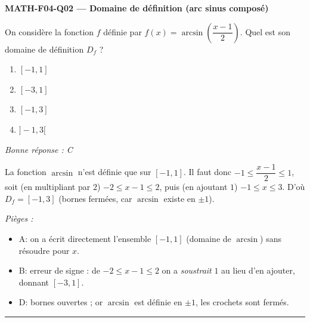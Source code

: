 \documentclass[11pt,a4paper]{article}
\begin{document}
\noindent\textbf{MATH-F04-Q02 --- Domaine de définition (arc sinus composé)}\par
On considère la fonction $f$ définie par $f(x)=\arcsin\!\left(\dfrac{x-1}{2}\right)$. Quel est son domaine de définition $D_f$ ?
\begin{enumerate}[label=\Alph*)]
\item $[-1, 1]$
\item $[-3, 1]$
\item $[-1, 3]$
\item $]-1, 3[$
\end{enumerate}
\textit{Bonne réponse : C}\par
La fonction $\arcsin$ n'est définie que sur $[-1, 1]$. Il faut donc $-1\leq\dfrac{x-1}{2}\leq 1$, soit (en multipliant par $2$) $-2\leq x-1\leq 2$, puis (en ajoutant $1$) $-1\leq x\leq 3$. D'où $D_f=[-1, 3]$ (bornes fermées, car $\arcsin$ existe en $\pm 1$).\par
\textit{Pièges :}
\begin{itemize}
\item A: on a écrit directement l'ensemble $[-1, 1]$ (domaine de $\arcsin$) sans résoudre pour $x$.
\item B: erreur de signe : de $-2\leq x-1\leq 2$ on a \emph{soustrait} $1$ au lieu d'en ajouter, donnant $[-3, 1]$.
\item D: bornes ouvertes ; or $\arcsin$ est définie en $\pm 1$, les crochets sont fermés.
\end{itemize}
\vspace{8pt}\hrule\vspace{8pt}
\end{document}

